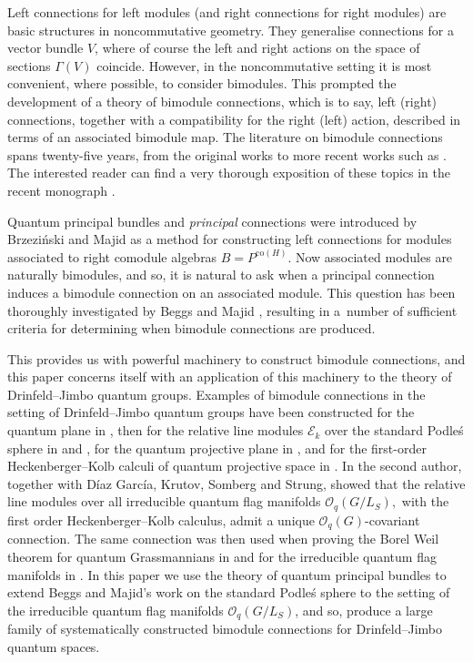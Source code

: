 \documentclass[pdftex]{sigma}
\numberwithin{equation}{section}
\begin{document}
Left connections for left modules (and right connections for right modules) are basic structures in noncommutative geometry. They generalise connections for a vector bundle $V$, where of course the left and right actions on the space of sections $\Gamma(V)$ coincide. However, in the noncommutative setting it is most convenient, where possible, to consider bimodules. This prompted the development of a theory of bimodule connections, which is to say, left (right) connections, together with a compatibility for the right (left) action, described in terms of an associated bimodule map. The literature on bimodule connections spans twenty-five years, from the original works \cite{MdV01, DVMa96, DVMi96, Madore99, MMM95} to more recent works such as \cite{AS14,BM17,BGL20, Aryan2020,M20}. The interested reader can find a very thorough exposition of these topics in the recent monograph \cite{BeggsMajid:Leabh}.

Quantum principal bundles and \emph{principal} connections were introduced by Brzezi\'{n}ski and Majid \cite{TBSM1} as a method for constructing left connections for modules associated to right comodule algebras $B = P^{\textrm{co}(H)}$. Now associated modules are naturally bimodules, and so, it is natural to ask when a principal connection induces a bimodule connection on an associated module. This question has been thoroughly investigated by Beggs and Majid \cite[Section~5.4]{BeggsMajid:Leabh}, resulting in a~number of sufficient criteria for determining when bimodule connections are produced.

This provides us with powerful machinery to construct bimodule connections, and this paper concerns itself with an application of this machinery to the theory of Drinfeld--Jimbo quantum groups.
Examples of bimodule connections in the setting of Drinfeld--Jimbo quantum groups have been constructed for the quantum plane in \cite{MouradDVMadore94}, then for the relative line modules $\mathcal{E}_{k}$ over the standard Podle\'s sphere in \cite{KLVSCP1} and \cite[Example 5.23]{BeggsMajid:Leabh}, for the quantum projective plane in \cite{KM11}, and for the first-order Heckenberger--Kolb calculi of quantum projective space in \cite{M20}. In \cite{HVBQFM} the second author, together with D\'iaz Garc\'ia, Krutov, Somberg and Strung, showed that the relative line modules over all irreducible quantum flag manifolds $\mathcal{O}_q(G/L_S),$ with the first order Heckenberger--Kolb calculus, admit a unique $\mathcal{O}_q(G)$-covariant connection. The same connection was then used when proving the Borel Weil theorem for quantum Grassmannians in \cite{BwGrass} and for the irreducible quantum flag manifolds in \cite{CDOBBW}.
In this paper we use the theory of quantum principal bundles to extend Beggs and Majid's work on the standard Podle\'{s} sphere to the setting of the irreducible quantum flag manifolds $\mathcal{O}_q(G/L_S)$, and so, produce a large family of systematically constructed bimodule connections for Drinfeld--Jimbo quantum spaces.
\end{document}
